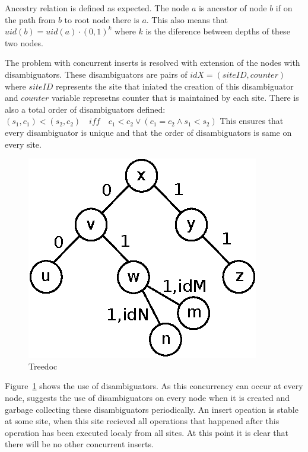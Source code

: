 \documentclass[12pt,oneside]{fithesis2}
\begin{document}
\par Ancestry relation is defined as expected. The node \(a\) is ancestor of node \(b\) if on the path from \(b\) to root node there is \(a\). This also means that \( uid(b) = uid(a) \cdot (0,1)^k \) where \(k\) is the diference between depths of these two nodes.
\par The problem with concurrent inserts is resolved with extension of the nodes with disambiguators. These disambiguators are pairs of \(idX = (siteID, counter)\) where \(siteID\) represents the site that iniated the creation of this disambiguator and \(counter\) variable represetns counter that is maintained by each site. There is also a total order of disambiguators defined: \( (s_1,c_1) < (s_2,c_2) \quad iff \quad c_1<c_2 \vee (c_1=c_2 \wedge s_1 < s_2) \) This ensures that every disambiguator is unique and that the order of disambiguators is same on every site. 
\begin{figure}[H]
\caption{Treedoc}
\label{fig:treedoc2}
\centering
\vspace{5mm}
\includegraphics{treedoc2} 
\end{figure}
\par Figure~\ref{fig:treedoc2} shows the use of disambiguators. As this concurrency can occur at every node, \cite{Shapiro-design} suggests the use of disambiguators on every node when it is created and garbage collecting these disambiguators periodically. An insert opeation is stable at some site, when this site recieved all operations that happened after this operation has been executed localy from all sites. At this point it is clear that there will be no other concurrent inserts. 
\end{document}
